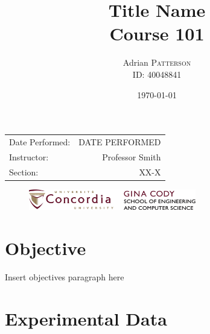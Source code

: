 \documentclass{article}
\title{Title Name \\ Course 101} %
\author{Adrian \textsc{Patterson} \\ ID: 40048841} %
\date{\today} %
\begin{document}
\begin{titlepage}
	\nointerlineskip  %
	\null  %
	\vfill
	\let\snewpage \newpage
	\let\newpage \relax
	\maketitle
	\begin{center}
		\begin{tabular}{l r}
			Date Performed: & DATE PERFORMED \\ %
			Instructor: & Professor Smith \\ %
			Section: & XX-X
		\end{tabular}
	\end{center}
	\let \newpage \snewpage
	\vspace{3in}
	\begin{figure}
		\centering
		\includegraphics[width=0.65\textwidth,scale=1.1]{ENCS.jpg} %
	\end{figure}
	\thispagestyle{empty}
\end{titlepage}






\newpage
\section{Objective}

Insert objectives paragraph here


 

\section{Experimental Data}
\end{document}
